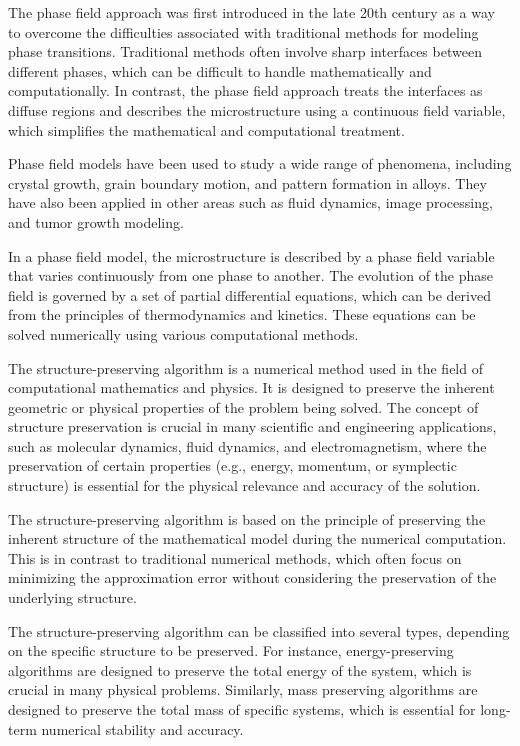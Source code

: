The phase field approach was first introduced in the late 20th century as a way to overcome the difficulties associated with traditional methods for modeling phase transitions. Traditional methods often involve sharp interfaces between different phases, which can be difficult to handle mathematically and computationally. In contrast, the phase field approach treats the interfaces as diffuse regions and describes the microstructure using a continuous field variable, which simplifies the mathematical and computational treatment.

Phase field models have been used to study a wide range of phenomena, including crystal growth, grain boundary motion, and pattern formation in alloys. They have also been applied in other areas such as fluid dynamics, image processing, and tumor growth modeling.

In a phase field model, the microstructure is described by a phase field variable that varies continuously from one phase to another. The evolution of the phase field is governed by a set of partial differential equations, which can be derived from the principles of thermodynamics and kinetics. These equations can be solved numerically using various computational methods.

The structure-preserving algorithm is a numerical method used in the field of computational mathematics and physics. It is designed to preserve the inherent geometric or physical properties of the problem being solved. The concept of structure preservation is crucial in many scientific and engineering applications, such as molecular dynamics, fluid dynamics, and electromagnetism, where the preservation of certain properties (e.g., energy, momentum, or symplectic structure) is essential for the physical relevance and accuracy of the solution.


The structure-preserving algorithm is based on the principle of preserving the inherent structure of the mathematical model during the numerical computation. This is in contrast to traditional numerical methods, which often focus on minimizing the approximation error without considering the preservation of the underlying structure.

The structure-preserving algorithm can be classified into several types, depending on the specific structure to be preserved. For instance, energy-preserving algorithms are designed to preserve the total energy of the system, which is crucial in many physical problems. Similarly, mass preserving algorithms are designed to preserve the total mass of specific systems, which is essential for long-term numerical stability and accuracy.


